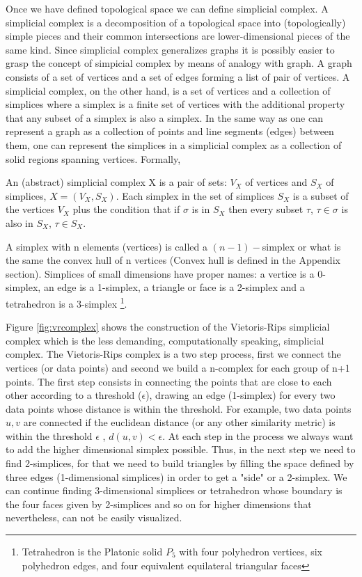 \documentclass[onecollarge,runningheads]{svjour2}
\begin{document}
Once we have defined topological space we can define simplicial complex. A simplicial complex is a decomposition of a topological space into (topologically) simple pieces and their common intersections are lower-dimensional pieces of the same kind. Since simplicial complex generalizes graphs it is possibly easier to grasp the concept of simpicial complex by means of analogy with graph. 
A graph consists of a set of vertices and a set of edges forming a list of pair of vertices. A simplicial complex, on the other hand, is a set of vertices and a collection of simplices where a simplex is a finite set of vertices with the additional property that any subset of a simplex is also a simplex. In the same way as one can represent a graph as a collection of points and line segments (edges) between them, one can represent the simplices in a simplicial complex as a collection of solid regions spanning vertices. Formally,

\begin{definition}
An (abstract) simplicial complex X is a pair of sets: $V_X$ of vertices and $S_X$ of simplices, $X=(V_X,S_X)$. Each simplex in the set of simplices $S_X$ is a subset of the vertices $V_X$ plus the condition that if $\sigma$ is in $S_X$ then every subset $\tau$, $\tau \in \sigma$ is also in $S_X$, $\tau \in S_X$.
\end{definition}

A simplex with n elements (vertices) is called a $(n-1)-$simplex or what is the same the convex hull of n vertices (Convex hull is defined in the Appendix section). Simplices of small dimensions have proper names: a vertice is a 0-simplex, an edge is a 1-simplex, a triangle or face is a 2-simplex and a tetrahedron is a 3-simplex \footnote{Tetrahedron is the Platonic solid $P_5$ with four polyhedron vertices, six polyhedron edges, and four equivalent equilateral triangular faces}.

Figure \ref{fig:vrcomplex} shows the construction of the Vietoris-Rips simplicial complex \cite{hausmann1995vietoris} which is the less demanding, computationally speaking, simplicial complex. The Vietoris-Rips complex is a two step process, first we connect the vertices (or data points) and second we build a n-complex for each group of n+1 points. The first step consists in connecting the points that are close to each other according to a threshold ($\epsilon$), drawing an edge (1-simplex) for every two data points whose distance is within the threshold. For example, two data points $u,v$ are connected if the euclidean distance (or any other similarity metric) is within the threshold $\epsilon$ , $d(u,v) < \epsilon$. At each step in the process we always want to add the higher dimensional simplex possible. Thus, in the next step we need to find 2-simplices, for that we need to build triangles by filling the space defined by three edges (1-dimensional simplices) in order to get a "side" or a 2-simplex. We can continue finding 3-dimensional simplices or tetrahedron whose boundary is the four faces given by 2-simplices and so on for higher dimensions that nevertheless, can not be easily visualized.
\end{document}
